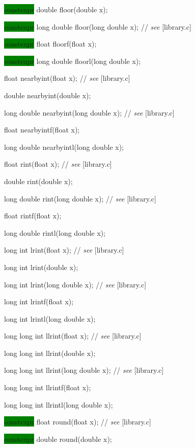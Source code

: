 \documentclass[prd,twocolumn,amsmath,amssymb,nofootinbib,eqsecnum]{revtex4-1}
\newcommand{\highlight}[1]{\colorbox{green}{\!\!\!\! #1}}
\newcommand{\stdcomment}[1]{{// {\it see} [#1]}}
\begin{document}
{\highlight{constexpr} double floor(double x);

\highlight{constexpr} long double floor(long double x); \stdcomment{library.c}

\highlight{constexpr} float floorf(float x);

\highlight{constexpr} long double floorl(long double x);

\vspace{2ex}

float nearbyint(float x); \stdcomment{library.c}

double nearbyint(double x);

long double nearbyint(long double x); \stdcomment{library.c}

 float nearbyintf(float x);

 long double nearbyintl(long double x);

\vspace{2ex}

 float rint(float x); \stdcomment{library.c}

 double rint(double x);

long double rint(long double x); \stdcomment{library.c}

 float rintf(float x);

 long double rintl(long double x);

\vspace{2ex}

long int lrint(float x); \stdcomment{library.c}

 long int lrint(double x);

long int lrint(long double x); \stdcomment{library.c}

 long int lrintf(float x);

long int lrintl(long double x);

\vspace{2ex}

long long int llrint(float x); \stdcomment{library.c}

long long int llrint(double x);

long long int llrint(long double x); \stdcomment{library.c}

long long int llrintf(float x);

long long int llrintl(long double x);

\vspace{2ex}

\highlight{constexpr} float round(float x); \stdcomment{library.c}

\highlight{constexpr} double round(double x);

}
\end{document}
